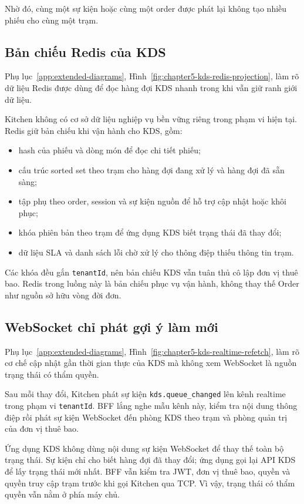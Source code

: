 Nhờ đó, cùng một sự kiện hoặc cùng một order được phát lại không tạo nhiều phiếu cho cùng một trạm.

\subsection{Bản chiếu Redis của KDS}

Phụ lục~\ref{app:extended-diagrams}, Hình~\ref{fig:chapter5-kds-redis-projection}, làm rõ dữ liệu Redis được dùng để đọc hàng đợi KDS nhanh trong khi vẫn giữ ranh giới dữ liệu.

Kitchen không có cơ sở dữ liệu nghiệp vụ bền vững riêng trong phạm vi hiện tại. Redis giữ bản chiếu khi vận hành cho KDS, gồm:

\begin{itemize}
  \item hash của phiếu và dòng món để đọc chi tiết phiếu;
  \item cấu trúc sorted set theo trạm cho hàng đợi đang xử lý và hàng đợi đã sẵn sàng;
  \item tập phụ theo order, session và sự kiện nguồn để hỗ trợ cập nhật hoặc khôi phục;
  \item khóa phiên bản theo trạm để ứng dụng KDS biết trạng thái đã thay đổi;
  \item dữ liệu SLA và danh sách lỗi chờ xử lý cho thông điệp thiếu thông tin trạm.
\end{itemize}

Các khóa đều gắn \texttt{tenantId}, nên bản chiếu KDS vẫn tuân thủ cô lập đơn vị thuê bao. Redis trong luồng này là bản chiếu phục vụ vận hành, không thay thế Order như nguồn sở hữu vòng đời đơn.

\subsection{WebSocket chỉ phát gợi ý làm mới}

Phụ lục~\ref{app:extended-diagrams}, Hình~\ref{fig:chapter5-kds-realtime-refetch}, làm rõ cơ chế cập nhật gần thời gian thực của KDS mà không xem WebSocket là nguồn trạng thái có thẩm quyền.

Sau mỗi thay đổi, Kitchen phát sự kiện \texttt{kds.queue\_changed} lên kênh realtime trong phạm vi \texttt{tenantId}. BFF lắng nghe mẫu kênh này, kiểm tra nội dung thông điệp rồi phát sự kiện WebSocket đến phòng KDS theo trạm và phòng quản trị của đơn vị thuê bao.

Ứng dụng KDS không dùng nội dung sự kiện WebSocket để thay thế toàn bộ trạng thái. Sự kiện chỉ cho biết hàng đợi đã thay đổi; ứng dụng gọi lại API KDS để lấy trạng thái mới nhất. BFF vẫn kiểm tra JWT, đơn vị thuê bao, quyền và quyền truy cập trạm trước khi gọi Kitchen qua TCP. Vì vậy, trạng thái có thẩm quyền vẫn nằm ở phía máy chủ.


